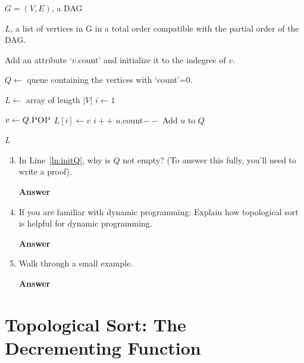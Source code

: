 \documentclass{article}
\begin{document}
\begin{algorithm}[h]
    \caption{Topological Sort}
    \begin{algorithmic}[1]
        \REQUIRE $G=(V,E)$, a DAG

        \ENSURE $L$, a list of vertices in G in a total order compatible with
        the partial order of the DAG.

            \STATE Add an attribute `$v$.count' and initialize it to the indegree of $v$.
        \ENDFOR

        \STATE $Q \gets$ queue containing the vertices with `count'=0.\label{ln:initQ}

        \STATE $L \gets$ array of length $|V|$
        \STATE $i \gets 1$

            \STATE $v \gets Q.\textsc{POP}$
            \STATE $L[i] \gets v$
            \STATE $i++$
                \STATE $u$.count$--$
                    \STATE Add $u$ to $Q$
                \ENDIF
            \ENDFOR
        \ENDWHILE

        \RETURN $L$
    \end{algorithmic}
\end{algorithm}

\pagebreak

\begin{enumerate}\setcounter{enumi}{2}

    \item In Line~\ref{ln:initQ}, why is $Q$ not empty? (To answer this fully, you'll
        need to write a proof).

        \textbf{Answer}
        \vspace{1in}

    \item   If you are familiar with dynamic programming:
        Explain how topological sort is helpful for dynamic programming.

        \textbf{Answer}
        \vspace{1in}

    \item Walk through a small example.

        \textbf{Answer}
\end{enumerate}

\pagebreak
\section*{Topological Sort: The Decrementing Function}
\end{document}
